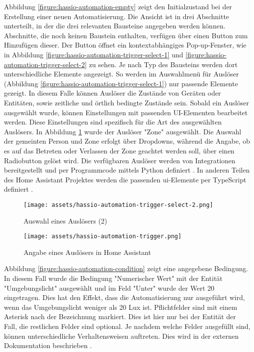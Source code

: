 Abbildung \ref{figure:hassio-automation-empty} zeigt den Initialzustand bei der Erstellung einer
neuen Automatisierung. Die Ansicht ist in drei Abschnitte unterteilt, in der die drei relevanten
Bausteine angegeben werden können. Abschnitte, die noch keinen Baustein enthalten, verfügen über
einen Button zum Hinzufügen dieser. Der Button öffnet ein kontextabhängiges Pop-up-Fenster, wie in
Abbildung \ref{figure:hassio-automation-trigger-select-1} und
\ref{figure:hassio-automation-trigger-select-2} zu sehen. Je nach Typ des Bausteins werden dort
unterschiedliche Elemente angezeigt. So werden im Auswahlmenü für Auslöser (Abbildung
\ref{figure:hassio-automation-trigger-select-1}) nur passende Elemente gezeigt. In diesem Falle
können Auslöser die Zustände von Geräten oder Entitäten, sowie zeitliche und örtlich bedingte
Zustände sein. Sobald ein Auslöser ausgewählt wurde, können Einstellungen mit passenden UI-Elementen
bearbeitet werden. Diese Einstellungen sind spezifisch für die Art des ausgewählten Auslösers. In
Abbildung \ref{figure:hassio-automation-trigger} wurde der Auslöser "Zone" ausgewählt. Die Auswahl
der gemeinten Person und Zone erfolgt über Dropdowns, während die Angabe, ob es auf das Betreten
oder Verlassen der Zone geachtet werden soll, über einen Radiobutton gelöst wird.  Die verfügbaren Auslöser werden von Integrationen bereitgestellt
und per Programmcode mittels Python definiert \parencite{homeassistantDeviceAutomations2023}. In
anderen Teilen des Home Assistant Projektes werden die passenden \ac{ui}-Elemente per TypeScript
definiert \parencite{homeassistantHomeassistantFrontend}.

\begin{figure}[!ht]
  \texttt{[image: assets/hassio-automation-trigger-select-2.png]}
  \caption{Auswahl eines Auslösers (2)}
  \label{figure:hassio-automation-trigger-select-2}
  \endminipage
  \hfill
  \texttt{[image: assets/hassio-automation-trigger.png]}
  \caption{Angabe eines Auslösers in Home Assistant}
  \label{figure:hassio-automation-trigger}
  \endminipage
\end{figure}

Abbildung \ref{figure:hassio-automation-condition} zeigt eine angegebene Bedingung. In diesem Fall
wurde  die Bedingung "Numerischer Wert" mit der Entität "Umgebungslicht" ausgewählt und im Feld
"Unter" wurde der Wert 20 eingetragen. Dies hat den Effekt, dass die Automatisierung nur ausgeführt
wird, wenn das Umgebungslicht weniger als 20 Lux ist. Pflichtfelder sind mit einem Asterisk nach der
Bezeichnung markiert. Dies ist hier nur bei der Entität der Fall, die restlichen Felder sind
optional. Je nachdem welche Felder ausgefüllt sind, können unterschiedliche Verhaltensweisen
auftreten. Dies wird in der externen Dokumentation beschrieben \parencite{homeassistantConditions}.

